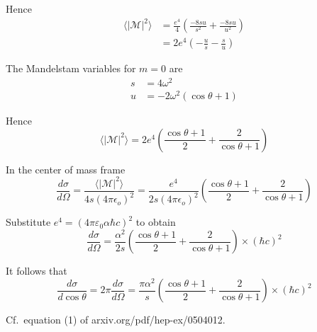 Hence
\begin{align*}
\langle|\mathcal{M}|^2\rangle
&=\frac{e^4}{4}
\left(\frac{-8su}{s^2}+\frac{-8su}{u^2}\right)
\\
&=2e^4
\left(-\frac{u}{s}-\frac{s}{u}\right)
\end{align*}

The Mandelstam variables for $m=0$ are
\begin{align*}
s&=4\omega^2
\\
u&=-2\omega^2(\cos\theta+1)
\end{align*}

Hence
\begin{equation*}
\langle|\mathcal{M}|^2\rangle
=2e^4\left(
\frac{\cos\theta+1}{2}+\frac{2}{\cos\theta+1}
\right)
\end{equation*}

In the center of mass frame
\begin{equation*}
\frac{d\sigma}{d\Omega}=\frac{\langle|\mathcal{M}|^2\rangle}{4s(4\pi\epsilon_o)^2}
=\frac{e^4}{2s(4\pi\epsilon_o)^2}\left(\frac{\cos\theta+1}{2}+\frac{2}{\cos\theta+1}\right)
\end{equation*}

Substitute $e^4=(4\pi\varepsilon_0\alpha\hbar c)^2$ to obtain
\begin{equation*}
\frac{d\sigma}{d\Omega}=\frac{\alpha^2}{2s}
\left(\frac{\cos\theta+1}{2}+\frac{2}{\cos\theta+1}\right)\times(\hbar c)^2
\end{equation*}

It follows that
\begin{equation*}
\frac{d\sigma}{d\cos\theta}=2\pi\frac{d\sigma}{d\Omega}
=\frac{\pi\alpha^2}{s}
\left(\frac{\cos\theta+1}{2}+\frac{2}{\cos\theta+1}\right)\times(\hbar c)^2
\end{equation*}

Cf.~equation (1) of arxiv.org/pdf/hep-ex/0504012.

\fi


